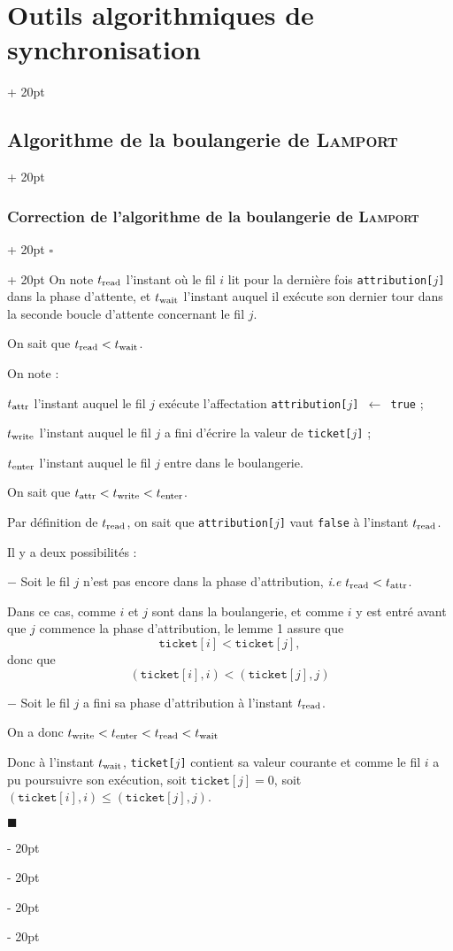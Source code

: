 \documentclass[a4paper, 12pt, twoside]{article}
\renewcommand{\le}{\leqslant}
\newcommand{\ind}[1][20pt]{\advance\leftskip + #1}
\newcommand{\deind}[1][20pt]{\advance\leftskip - #1}
\newenvironment{indt}[2][20pt]{#2 \par \ind[#1]}{\par \deind} %
\newenvironment{proof}[1][{}]{\begin{indt}{$\square$ #1}}{$\blacksquare$ \end{indt}}
\begin{document}
\begin{indt}{\section{Outils algorithmiques de synchronisation}}
\begin{indt}{\subsection{Algorithme de la boulangerie de \textsc{Lamport}}}
\begin{indt}{\subsubsection{Correction de l'algorithme de la boulangerie de \textsc{Lamport}}}
                \begin{proof}
                    On note $t_{\rm read}$ l'instant où le fil $i$ lit pour la dernière fois \texttt{attribution[$j$]} dans la phase d'attente, et $t_{\rm wait}$ l'instant auquel il exécute son dernier tour dans la seconde boucle d'attente concernant le fil $j$.

                    On sait que $t_{\rm read} < t_{\rm wait}$.

                    On note :

                    $t_{\rm attr}$ l'instant auquel le fil $j$ exécute l'affectation \texttt{attribution[$j$] $\leftarrow$ true} ;

                    $t_{\rm write}$ l'instant auquel le fil $j$ a fini d'écrire la valeur de \texttt{ticket[$j$]} ;

                    $t_{\rm enter}$ l'instant auquel le fil $j$ entre dans le boulangerie.

                    \vspace{6pt}
                    
                    On sait que $t_{\rm attr} < t_{\rm write} < t_{\rm enter}$.

                    Par définition de $t_{\rm read}$, on sait que \texttt{attribution[$j$]} vaut \texttt{false} à l'instant $t_{\rm read}$.

                    Il y a deux possibilités :

                    $-$ Soit le fil $j$ n'est pas encore dans la phase d'attribution, \textit{i.e} $t_{\rm read} < t_{\rm attr}$.

                    Dans ce cas, comme $i$ et $j$ sont dans la boulangerie, et comme $i$ y est entré avant que $j$ commence la phase d'attribution, le lemme 1 assure que
                    \[
                        \mathtt{ticket}[i] < \mathtt{ticket}[j],
                    \]
                    donc que
                    \[
                        (\mathtt{ticket}[i], i) < (\mathtt{ticket}[j], j)
                    \]

                    $-$ Soit le fil $j$ a fini sa phase d'attribution à l'instant $t_{\rm read}$.

                    On a donc $t_{\rm write} < t_{\rm enter} < t_{\rm read} < t_{\rm wait}$

                    Donc à l'instant $t_{\rm wait}$, \texttt{ticket[$j$]} contient sa valeur courante et comme le fil $i$ a pu poursuivre son exécution, soit $\mathtt{ticket}[j] = 0$, soit $(\mathtt{ticket}[i], i) \le (\mathtt{ticket}[j], j)$.


\end{proof}
\end{indt}
\end{indt}
\end{indt}
\end{document}
